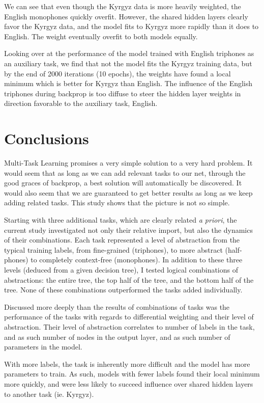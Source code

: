 \documentclass[a4paper]{article}
\begin{document}
We can see that even though the Kyrgyz data is more heavily weighted, the English monophones quickly overfit. However, the shared hidden layers clearly favor the Kyrgyz data, and the model fits to Kyrgyz more rapidly than it does to English. The weight eventually overfit to both models equally.

Looking over at the performance of the model trained with English triphones as an auxiliary task, we find that not the model fits the Kyrgyz training data, but by the end of 2000 iterations (10 epochs), the weights have found a local minimum which is better for Kyrgyz than English. The influence of the English triphones during backprop is too diffuse to steer the hidden layer weights in direction favorable to the auxiliary task, English.


\section{Conclusions}

Multi-Task Learning promises a very simple solution to a very hard problem. It would seem that as long as we can add relevant tasks to our net, through the good graces of backprop, a best solution will automatically be discovered. It would also seem that we are guaranteed to get better results as long as we keep adding related tasks. This study shows that the picture is not so simple.

Starting with three additional tasks, which are clearly related \textit{a priori}, the current study investigated not only their relative import, but also the dynamics of their combinations. Each task represented a level of abstraction from the typical training labels, from fine-grained (triphones), to more abstract (half-phones) to completely context-free (monophones). In addition to these three levels (deduced from a given decision tree), I tested logical combinations of abstractions: the entire tree, the top half of the tree, and the bottom half of the tree. None of these combinations outperformed the tasks added individually.

Discussed more deeply than the results of combinations of tasks was the performance of the tasks with regards to differential weighting and their level of abstraction. Their level of abstraction correlates to number of labels in the task, and as such number of nodes in the output layer, and as such number of parameters in the model.

With more labels, the task is inherently more difficult and the model has more parameters to train. As such, models with fewer labels found their local minimum more quickly, and were less likely to succeed influence over shared hidden layers to another task (ie. Kyrgyz).
\end{document}
